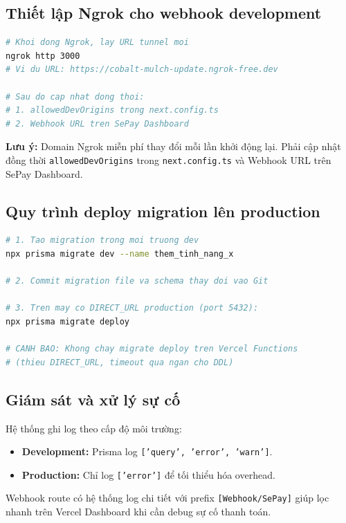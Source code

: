 \documentclass[14pt,a4paper]{report}
\begin{document}
\subsection{Thiết lập Ngrok cho webhook development}

\begin{lstlisting}[language=bash, caption={Thiết lập đường hầm Ngrok để nhận webhook SePay}]
# Khoi dong Ngrok, lay URL tunnel moi
ngrok http 3000
# Vi du URL: https://cobalt-mulch-update.ngrok-free.dev

# Sau do cap nhat dong thoi:
# 1. allowedDevOrigins trong next.config.ts
# 2. Webhook URL tren SePay Dashboard
\end{lstlisting}

\textbf{Lưu ý:} Domain Ngrok miễn phí thay đổi mỗi lần khởi động
lại. Phải cập nhật đồng thời \texttt{allowedDevOrigins} trong
\texttt{next.config.ts} và Webhook URL trên SePay Dashboard.

\subsection{Quy trình deploy migration lên production}

\begin{lstlisting}[language=bash, caption={Quy trình deploy migration an toàn}]
# 1. Tao migration trong moi truong dev
npx prisma migrate dev --name them_tinh_nang_x

# 2. Commit migration file va schema thay doi vao Git

# 3. Tren may co DIRECT_URL production (port 5432):
npx prisma migrate deploy

# CANH BAO: Khong chay migrate deploy tren Vercel Functions
# (thieu DIRECT_URL, timeout qua ngan cho DDL)
\end{lstlisting}

\subsection{Giám sát và xử lý sự cố}

Hệ thống ghi log theo cấp độ môi trường:
\begin{itemize}
    \item \textbf{Development:} Prisma log
          \texttt{['query', 'error', 'warn']}.
    \item \textbf{Production:} Chỉ log \texttt{['error']} để tối thiểu
          hóa overhead.
\end{itemize}

Webhook route có hệ thống log chi tiết với prefix
\texttt{[Webhook/SePay]} giúp lọc nhanh trên Vercel Dashboard khi
cần debug sự cố thanh toán.
\end{document}
